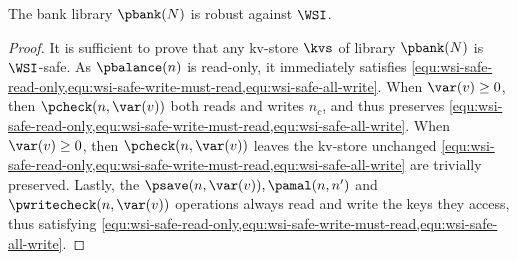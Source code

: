 \begin{theorem}
The bank library \( \pbank(N) \) is robust against \( \WSI \).
\end{theorem}
\begin{proof}
It is sufficient to prove that any kv-store \( \kvs \) of library \( \pbank(N) \) is \( \WSI \)-safe.
As \(\pbalance(n) \) is read-only, 
it immediately satisfies \cref{equ:wsi-safe-read-only,equ:wsi-safe-write-must-read,equ:wsi-safe-all-write}.
When \(\var(v) \geq 0\), then \(\pcheck(n,\var(v)) \) both reads and writes \( n_c \), and thus preserves  
\cref{equ:wsi-safe-read-only,equ:wsi-safe-write-must-read,equ:wsi-safe-all-write}.
When \(\var(v) \geq 0\), then \(\pcheck(n,\var(v)) \) leaves the kv-store unchanged
\cref{equ:wsi-safe-read-only,equ:wsi-safe-write-must-read,equ:wsi-safe-all-write} are trivially preserved.
Lastly, the
\( \psave(n,\var(v)), \pamal(n,n') \) and \( \pwritecheck(n,\var(v)) \) operations
always read and write the keys they access, 
thus satisfying \cref{equ:wsi-safe-read-only,equ:wsi-safe-write-must-read,equ:wsi-safe-all-write}.
\end{proof}

